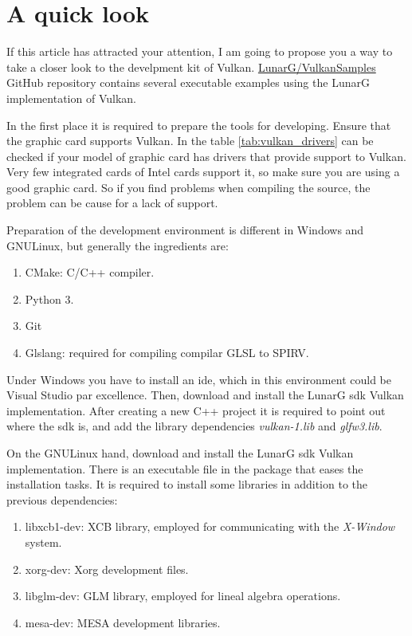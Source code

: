 \chapter{A quick look}
If this article has attracted your attention, I am going to propose you a way to take a closer look to the develpment
kit of Vulkan. \href{https://github.com/LunarG/VulkanSamples}{LunarG/VulkanSamples} GitHub repository contains several
executable examples using the LunarG implementation of Vulkan.

In the first place it is required to prepare the tools for developing. Ensure that the graphic card supports Vulkan. In
the table \ref{tab:vulkan_drivers} can be checked if your model of graphic card has drivers that provide support to
Vulkan. Very few integrated cards of Intel cards support it, so make sure you are using a good graphic card. So if you
find problems when compiling the source, the problem can be cause for a lack of support.

Preparation of the development environment is different in Windows and GNU\/Linux, but generally the ingredients are:
\begin{enumerate}
    \item CMake: C/C++ compiler.
    \item Python 3.
    \item Git
    \item Glslang: required for compiling compilar GLSL to SPIRV.
\end{enumerate}

Under Windows you have to install an \gls{ide}, which in this environment could be Visual Studio par excellence. Then,
download and install the LunarG \gls{sdk} Vulkan implementation. After creating a new C++ project it is required to
point out where the \gls{sdk} is, and add the library dependencies \emph{vulkan-1.lib} and \emph{glfw3.lib}.

On the GNU\/Linux hand, download and install the LunarG \gls{sdk} Vulkan implementation. There is an executable file
in the package that eases the installation tasks. It is required to install some libraries in addition to the
previous dependencies:
\begin{enumerate}
    \item libxcb1-dev: XCB library, employed for communicating with the \emph{X-Window} system.
    \item xorg-dev: Xorg development files.
    \item libglm-dev: GLM library, employed for lineal algebra operations.
    \item mesa-dev: MESA development libraries.
\end{enumerate}

